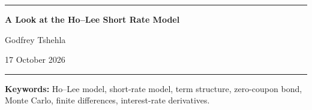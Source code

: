 \documentclass[10pt,a4paper]{article}
\numberwithin{equation}{section}
\begin{document}
\begin{center}

{\color{sectionblue}\rule{\textwidth}{1.2pt}}

\vspace{0.45cm}

{\LARGE\bfseries
A Look at the Ho--Lee Short Rate Model
}

\vspace{0.35cm}

{\large
Godfrey Tshehla
}

\vspace{0.15cm}

{\small
17 October 2026
}

\vspace{0.35cm}

{\color{ruleblue}\rule{\textwidth}{0.6pt}}

\end{center}

\vspace{0.25cm}

\begin{abstract}
\noindent
This paper studies the Ho--Lee short-rate model and its application to
term-structure modelling and interest-rate contingent-claim pricing.
The model is calibrated to an initial term structure through a
time-dependent drift, while interest-rate uncertainty is represented by
a constant volatility parameter. Zero-coupon bonds and European options
on zero-coupon bonds are valued analytically and numerically using Monte
Carlo simulation, finite-difference methods, and a calibrated lattice.
The numerical results are used to assess consistency across valuation
methods and to illustrate the implications of the model's Gaussian
dynamics and absence of mean reversion.
\end{abstract}

\vspace{0.15cm}

\noindent
\textbf{Keywords:}
Ho--Lee model, short-rate model, term structure, zero-coupon bond,
Monte Carlo, finite differences, interest-rate derivatives.

\vspace{0.4cm}
\end{document}
